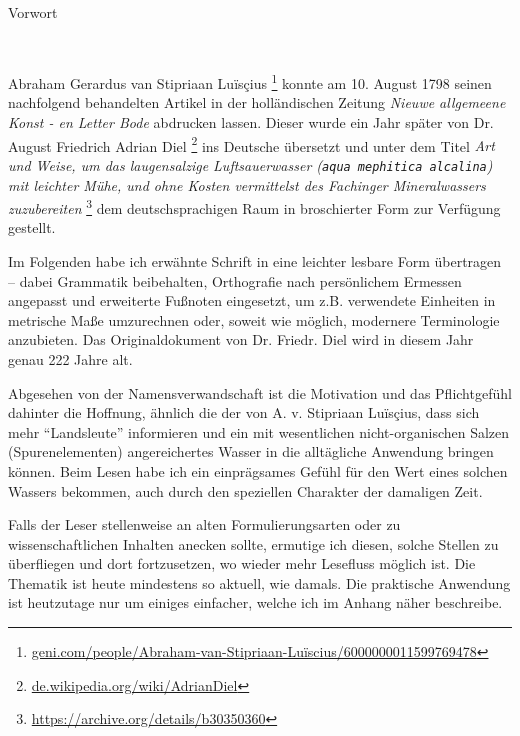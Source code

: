\documentclass[a5paper,fontsize=10pt]{memoir}
\begin{document}

{\centering
{\Large Vorwort}
\vspace{2em}

\begin{minipage}{4cm}
  \hrulefill\\
\end{minipage}

}
\vfill
Abraham Gerardus van Stipriaan Luïsçius%
\footnote{\href{https://web.archive.org/web/20210927050342/https://www.geni.com/people/Abraham-van-Stipriaan-Luïscius/6000000011599769478}
{geni.com/people/Abraham-van-Stipriaan-Luïscius/6000000011599769478}}
konnte am 10. August 1798
seinen nachfolgend behandelten Artikel in der holländischen Zeitung
\emph{Nieuwe allgemeene Konst - en Letter Bode}
abdrucken lassen.
Dieser wurde ein Jahr später
von Dr. August Friedrich Adrian Diel%
\footnote{\href{https://web.archive.org/web/20160828042236/https://de.wikipedia.org/wiki/Adrian_Diel}
{de.wikipedia.org/wiki/Adrian\textunderscore Diel}}
ins Deutsche übersetzt und unter dem Titel
\emph{Art und Weise,
um das laugensalzige Luftsauerwasser
(\texttt{aqua mephitica alcalina})
mit leichter Mühe, und ohne Kosten
vermittelst des Fachinger Mineralwassers zuzubereiten}%
\footnote{\href{https://archive.org/details/b30350360}
{https://archive.org/details/b30350360}}
dem deutschsprachigen Raum in broschierter Form
zur Verfügung gestellt.

Im Folgenden habe ich erwähnte Schrift
in eine leichter lesbare Form übertragen --
dabei Grammatik beibehalten,
Orthografie nach persönlichem Ermessen angepasst
und erweiterte Fußnoten eingesetzt,
um z.B. verwendete Einheiten in metrische Maße umzurechnen
oder, soweit wie möglich, modernere Terminologie anzubieten.
Das Originaldokument von Dr. Friedr. Diel
wird in diesem Jahr genau 222 Jahre alt.

Abgesehen von der Namensverwandschaft
ist die Motivation und das Pflichtgefühl dahinter
die Hoffnung,
ähnlich die der von A. v. Stipriaan Luïsçius,
dass sich mehr ``Landsleute'' informieren und ein
mit wesentlichen nicht-organischen Salzen (Spurenelementen)
angereichertes Wasser
in die alltägliche Anwendung bringen können.
Beim Lesen habe ich ein einprägsames Gefühl für den Wert
eines solchen Wassers bekommen,
auch durch den speziellen Charakter der damaligen Zeit.

Falls der Leser
stellenweise an alten Formulierungsarten
oder zu wissenschaftlichen Inhalten anecken
sollte, ermutige ich diesen,
solche Stellen zu überfliegen und dort fortzusetzen,
wo wieder mehr Lesefluss möglich ist.
Die Thematik ist heute mindestens so aktuell, wie damals.
Die praktische Anwendung ist heutzutage nur um einiges einfacher,
welche ich im Anhang näher beschreibe.
\end{document}
